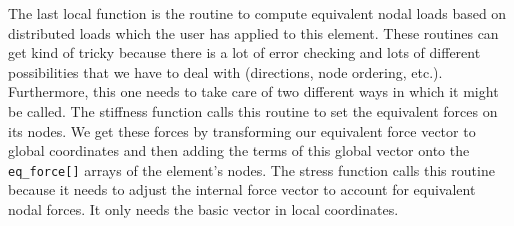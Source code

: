 The last local function is the routine to compute equivalent nodal
loads based on distributed loads which the user has applied to this
element.  These routines can get kind of tricky because there
is a lot of error checking and lots of different possibilities
that we have to deal with (directions, node ordering, etc.).  Furthermore,
this one needs to take care of two different ways in which it might
be called.  The stiffness function calls this routine to set the
equivalent forces on its nodes.  We get these forces by transforming
our equivalent force vector to global coordinates and then adding the terms
of this global vector onto the {\tt eq\_force[]} arrays of the element's nodes.
The stress function calls this routine because it needs to adjust the internal 
force vector to account for equivalent nodal forces.  It only needs
the basic vector in local coordinates.

